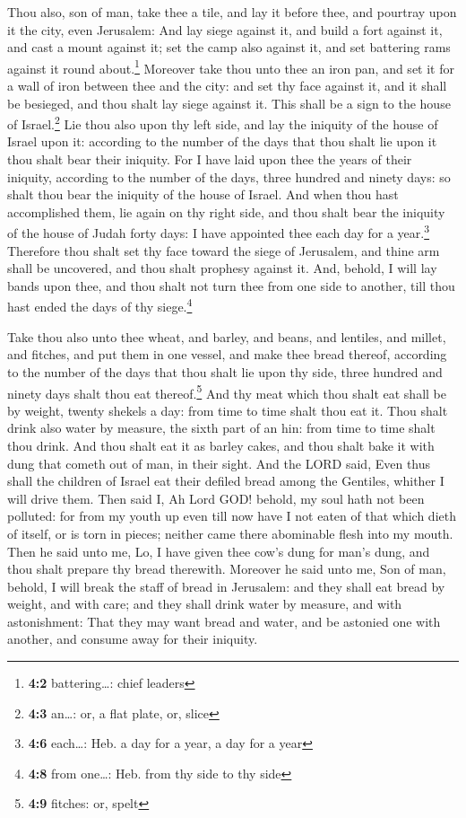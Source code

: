  Thou also, son of man, take thee a tile, and lay it
before thee, and pourtray upon it the city, even Jerusalem:
 And lay siege against it, and build a fort against it,
and cast a mount against it; set the camp also against it, and set
battering rams against it round about.\footnote{\textbf{4:2}
  battering\ldots: chief leaders}  Moreover take thou unto
thee an iron pan, and set it for a wall of iron between thee and the
city: and set thy face against it, and it shall be besieged, and thou
shalt lay siege against it. This shall be a sign to the house of
Israel.\footnote{\textbf{4:3} an\ldots: or, a flat plate, or, slice}
 Lie thou also upon thy left side, and lay the iniquity of
the house of Israel upon it: according to the number of the days that
thou shalt lie upon it thou shalt bear their iniquity. 
For I have laid upon thee the years of their iniquity, according to the
number of the days, three hundred and ninety days: so shalt thou bear
the iniquity of the house of Israel.  And when thou hast
accomplished them, lie again on thy right side, and thou shalt bear the
iniquity of the house of Judah forty days: I have appointed thee each
day for a year.\footnote{\textbf{4:6} each\ldots: Heb. a day for a year,
  a day for a year}  Therefore thou shalt set thy face
toward the siege of Jerusalem, and thine arm shall be uncovered, and
thou shalt prophesy against it.  And, behold, I will lay
bands upon thee, and thou shalt not turn thee from one side to another,
till thou hast ended the days of thy siege.\footnote{\textbf{4:8} from
  one\ldots: Heb. from thy side to thy side}

 Take thou also unto thee wheat, and barley, and beans,
and lentiles, and millet, and fitches, and put them in one vessel, and
make thee bread thereof, according to the number of the days that thou
shalt lie upon thy side, three hundred and ninety days shalt thou eat
thereof.\footnote{\textbf{4:9} fitches: or, spelt}  And
thy meat which thou shalt eat shall be by weight, twenty shekels a day:
from time to time shalt thou eat it.  Thou shalt drink
also water by measure, the sixth part of an hin: from time to time shalt
thou drink.  And thou shalt eat it as barley cakes, and
thou shalt bake it with dung that cometh out of man, in their sight.
 And the LORD said, Even thus shall the children of
Israel eat their defiled bread among the Gentiles, whither I will drive
them.  Then said I, Ah Lord GOD! behold, my soul hath not
been polluted: for from my youth up even till now have I not eaten of
that which dieth of itself, or is torn in pieces; neither came there
abominable flesh into my mouth.  Then he said unto me,
Lo, I have given thee cow's dung for man's dung, and thou shalt prepare
thy bread therewith.  Moreover he said unto me, Son of
man, behold, I will break the staff of bread in Jerusalem: and they
shall eat bread by weight, and with care; and they shall drink water by
measure, and with astonishment:  That they may want bread
and water, and be astonied one with another, and consume away for their
iniquity.


